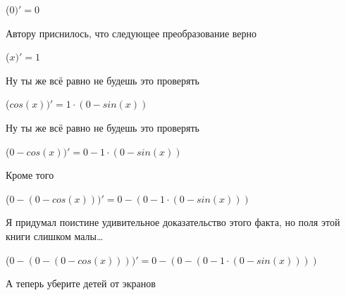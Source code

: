 \documentclass[12pt,a4paper,fleqn]{article}
\begin{document}
\begin{center}
\begin{center}
\begin{center}
\begin{center}
\begin{center}
\begin{center}
\begin{center}
\begin{center}
\begin{center}
\begin{center}
\begin{center}
\begin{center}
\begin{center}
\begin{center}
\begin{center}
\begin{center}
\begin{center}
\begin{center}
\begin{center}
\begin{center}
\begin{center}
\begin{center}
\begin{center}
\begin{center}
\begin{center}
\begin{center}
\begin{center}
\begin{center}
\begin{center}
\begin{center}
\begin{center}
\begin{center}
\begin{center}
\begin{center}
\begin{center}
\begin{center}
\begin{center}
\begin{center}
\begin{center}
\begin{center}
\begin{center}
\begin{center}
\begin{center}
\begin{center}
\begin{center}
\begin{center}
\begin{center}
\begin{center}
\begin{center}
\begin{center}
\begin{center}
\begin{center}
\begin{center}
\begin{center}
\begin{center}
\begin{center}
\begin{center}
\begin{center}
\begin{center}
\begin{center}
\begin{center}
\begin{center}
\begin{center}
\begin{center}
\begin{center}
\begin{center}
\begin{center}
\begin{center}
 ($0)'
  = 0$\end{center}
Автору приснилось, что следующее преобразование верно

\begin{center}
 ($x)'
  = 1$\end{center}
Ну ты же всё равно не будешь это проверять

\begin{center}
 ($cos(x))'
  = 1 \cdot (0-sin(x))$\end{center}
Ну ты же всё равно не будешь это проверять

\begin{center}
 ($0-cos(x))'
  = 0-1 \cdot (0-sin(x))$\end{center}
Кроме того

\begin{center}
 ($0-(0-cos(x)))'
  = 0-(0-1 \cdot (0-sin(x)))$\end{center}
Я придумал поистине удивительное доказательство этого факта, но поля этой книги слишком малы\ldots

\begin{center}
 ($0-(0-(0-cos(x))))'
  = 0-(0-(0-1 \cdot (0-sin(x))))$\end{center}
А теперь уберите детей от экранов


\end{center}
\end{center}
\end{center}
\end{center}
\end{center}
\end{center}
\end{center}
\end{center}
\end{center}
\end{center}
\end{center}
\end{center}
\end{center}
\end{center}
\end{center}
\end{center}
\end{center}
\end{center}
\end{center}
\end{center}
\end{center}
\end{center}
\end{center}
\end{center}
\end{center}
\end{center}
\end{center}
\end{center}
\end{center}
\end{center}
\end{center}
\end{center}
\end{center}
\end{center}
\end{center}
\end{center}
\end{center}
\end{center}
\end{center}
\end{center}
\end{center}
\end{center}
\end{center}
\end{center}
\end{center}
\end{center}
\end{center}
\end{center}
\end{center}
\end{center}
\end{center}
\end{center}
\end{center}
\end{center}
\end{center}
\end{center}
\end{center}
\end{center}
\end{center}
\end{center}
\end{center}
\end{center}
\end{center}
\end{center}
\end{center}
\end{center}
\end{center}
\end{document}
